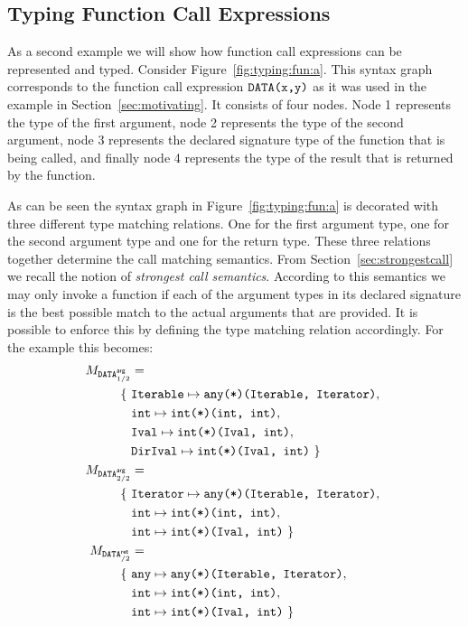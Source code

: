 \documentclass{sigplanconf}
\newcommand{\ms}[1]{\mathsf{#1}}
\newcommand{\mt}[1]{\text{\tt #1}}
\begin{document}
\subsection{Typing Function Call Expressions}

As a second example we will show how function call expressions can be
represented and typed. Consider Figure~\ref{fig:typing:fun:a}. This
syntax graph corresponds to the function call expression
$\verb+DATA(x,y)+$ as it was used in the example in
Section~\ref{sec:motivating}. It consists of four nodes. Node 1
represents the type of the first argument, node 2 represents the type
of the second argument, node 3 represents the declared signature type
of the function that is being called, and finally node 4 represents
the type of the result that is returned by the function.

As can be seen the syntax graph in Figure~\ref{fig:typing:fun:a} is
decorated with three different type matching relations.
One for the first argument type, one for the second argument type and
one for the return type.  These three relations together determine the
call matching semantics. From Section~\ref{sec:strongestcall} we
recall the notion of \emph{strongest call semantics}. According to
this semantics we may only invoke a function if each of the argument
types in its declared signature is the best possible match to the
actual arguments that are provided. It is possible to enforce this by
defining the type matching relation accordingly. For the example this
becomes:
\begin{align*}
 M_{\mt{DATA}^\ms{arg}_{1/2}} &= \\
\{\ &\mt{Iterable} \mapsto \mt{any(*)(Iterable, Iterator)},\ \\
&\mt{int} \mapsto \mt{int(*)(int, int)},\ \\
&\mt{Ival} \mapsto \mt{int(*)(Ival, int)},\ \\
&\mt{DirIval} \mapsto \mt{int(*)(Ival, int)}\ \} \\
M_{\mt{DATA}^\ms{arg}_{2/2}} &= \\
\{\ &\mt{Iterator} \mapsto \mt{any(*)(Iterable, Iterator)},\ \\
&\mt{int} \mapsto \mt{int(*)(int, int)},\ \\
&\mt{int} \mapsto \mt{int(*)(Ival, int)}\ \} \\
M_{\mt{DATA}^\ms{ret}_{/2}} &= \\
\{\ &\mt{any} \mapsto \mt{any(*)(Iterable, Iterator)},\ \\
&\mt{int} \mapsto \mt{int(*)(int, int)},\ \\
&\mt{int} \mapsto \mt{int(*)(Ival, int)}\ \}
\end{align*}
\end{document}
